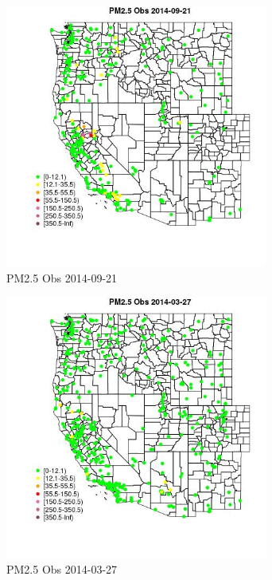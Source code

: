 \begin{figure} 
\centering  
\includegraphics[width=0.77\textwidth]{Code_Outputs/Report_ML_input_PM25_Step4_part_e_de_duplicated_aveswNAs_MapObsPM25_Obs2014-09-21.jpg} 
\caption{\label{fig:Report_ML_input_PM25_Step4_part_e_de_duplicated_aveswNAsMapObsPM25_Obs2014-09-21}PM2.5 Obs 2014-09-21} 
\end{figure} 
 

\begin{figure} 
\centering  
\includegraphics[width=0.77\textwidth]{Code_Outputs/Report_ML_input_PM25_Step4_part_e_de_duplicated_aveswNAs_MapObsPM25_Obs2014-03-27.jpg} 
\caption{\label{fig:Report_ML_input_PM25_Step4_part_e_de_duplicated_aveswNAsMapObsPM25_Obs2014-03-27}PM2.5 Obs 2014-03-27} 
\end{figure} 
 

